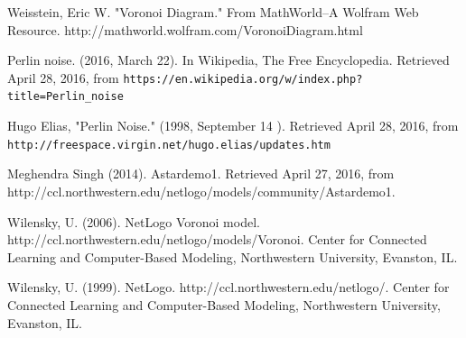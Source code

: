 \documentclass[conference]{IEEEtran}
\begin{document}
%
%
%
\begin{thebibliography}{1}
Weisstein, Eric W. "Voronoi Diagram." From MathWorld--A Wolfram Web Resource. http://mathworld.wolfram.com/VoronoiDiagram.html

Perlin noise. (2016, March 22). In Wikipedia, The Free Encyclopedia. Retrieved  April 28, 2016, from \verb+https://en.wikipedia.org/w/index.php?title=Perlin_noise+

Hugo Elias, "Perlin Noise." (1998, September 14 ). Retrieved April 28, 2016, from \verb+http://freespace.virgin.net/hugo.elias/updates.htm+

Meghendra Singh (2014). Astardemo1. Retrieved April 27, 2016, from http://ccl.northwestern.edu/netlogo/models/community/Astardemo1.

Wilensky, U. (2006). NetLogo Voronoi model. http://ccl.northwestern.edu/netlogo/models/Voronoi. Center for Connected Learning and Computer-Based Modeling, Northwestern University, Evanston, IL.

Wilensky, U. (1999). NetLogo. http://ccl.northwestern.edu/netlogo/. Center for Connected Learning and Computer-Based Modeling, Northwestern University, Evanston, IL.

\end{thebibliography}

\end{document}

